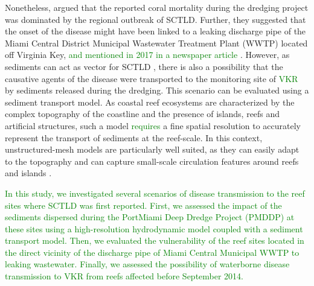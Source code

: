 \documentclass[preprint,12pt,authoryear]{elsarticle}
\newcommand{\modif}[1]{\textcolor{green}{#1}}
\begin{document}
Nonetheless, \cite{gintert2019regional} argued that the reported coral mortality during the dredging project was dominated by the regional outbreak of SCTLD. Further, they suggested that the onset of the disease might have been linked to a leaking discharge pipe of the Miami Central District Municipal Wastewater Treatment Plant (WWTP) located off Virginia Key, \modif{and mentioned in 2017 in a newspaper article \citep{staletovich2017}}. However, as sediments can act as vector for SCTLD \citep{studivan2022reef}, there is also a possibility that the causative agents of the disease were transported to the monitoring site of \modif{VKR} by sediments released during the dredging. This scenario can be evaluated using a sediment transport model. As coastal reef ecosystems are characterized by the complex topography of the coastline and the presence of islands, reefs and artificial structures, such a model \modif{requires} a fine spatial resolution to accurately represent the transport of sediments at the reef-scale. In this context, unstructured-mesh models are particularly well suited, as they can easily adapt to the topography \citep{fringer2019future} and can capture small-scale circulation features around reefs and islands \citep{lambrechts2008multi}.

\modif{In this study, we investigated several scenarios of disease transmission to the reef sites where SCTLD was first reported. First, we assessed the impact of the sediments dispersed during the PortMiami Deep Dredge Project (PMDDP) at these sites using a high-resolution hydrodynamic model coupled with a sediment transport model. Then, we evaluated the vulnerability of the reef sites located in the direct vicinity of the discharge pipe of Miami Central Municipal WWTP to leaking wastewater. Finally, we assessed the possibility of waterborne disease transmission to VKR from reefs affected before September 2014.}

\end{document}
